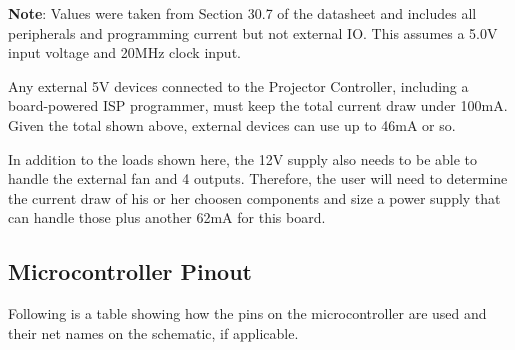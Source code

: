 \documentclass{article}
\begin{document}
{\small \textbf{Note}: Values were taken from Section 30.7 of the datasheet and includes all peripherals and
programming current but not external IO.  This assumes a 5.0V input voltage and 20MHz clock input.}

Any external 5V devices connected to the Projector Controller, including a board-powered ISP
programmer, must keep the total current draw under 100mA.  Given the total shown above, external
devices can use up to 46mA or so.

In addition to the loads shown here, the 12V supply also needs to be able to handle the external fan
and 4 outputs.  Therefore, the user will need to determine the current draw of his or her choosen
components and size a power supply that can handle those plus another 62mA for this board.

\subsection{Microcontroller Pinout} \label{ssec:MicroPinout}
Following is a table showing how the pins on the microcontroller are used and their net names on the
schematic, if applicable.
\end{document}
